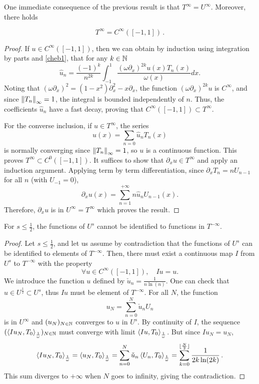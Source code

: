 \documentclass[a4paper]{article}
\begin{document}
\noindent 
One immediate consequence of the previous result is that $T^{\infty} = U^{\infty}$. Moreover, there holds
\begin{Lem}
	\[T^{\infty} = C^{\infty}([-1,1])\,.\]
	\label{LemTinfCinf}
\end{Lem}
\begin{proof}
	If $u \in C^{\infty}([-1,1])$, then we can obtain by induction using integration by parts and \eqref{cheb1}, that for any $k \in \mathbb{N}$
	\[\hat{u}_n = \frac{(-1)^k}{n^{2k}} \int_{-1}^{1} \dfrac{(\omega\partial_x)^{2k} u(x) T_n(x)}{\omega(x)}dx.\]
	Noting that $(\omega \partial_x)^2 = (1-x^2)\partial_x^2 - x \partial_ x$, the function $(\omega \partial_x)^{2k}u$ is $C^{\infty}$, and since $\left\|T_n\right\|_\infty = 1$, the integral is bounded independently of $n$. Thus, the coefficients $\hat{u}_n$ have a fast decay, proving that $C^{\infty}([-1,1]) \subset T^{\infty}$. 
	
	For the converse inclusion, if $u \in T^{\infty}$, the series
	\[ u(x) = \sum_{n=0} \hat{u}_n T_n(x)\]
	is normally converging since $\left\|T_n\right\|_\infty = 1$, so $u$ is a continuous function. This proves $T^{\infty} \subset C^0([-1,1])$. It suffices to show that $\partial_x u \in T^{\infty}$ and apply an induction argument. Applying term by term differentiation, since $\partial_x T_n = n U_{n-1}$ for all $n$ (with $U_{-1} = 0$),
	\[\partial_x u(x) = \sum_{n=1}^{+\infty} n \hat{u}_n U_{n-1}(x).\] 
	Therefore, $\partial_x u$ is in $U^{\infty} = T^{\infty}$ which proves the result.
\end{proof}
\begin{Lem}
	For $s \leq \frac{1}{2}$, the functions of $U^s$ cannot be identified to functions in $T^{-\infty}$. 	
\end{Lem}
\begin{proof}
	Let $s \leq \frac{1}{2}$, and let us assume by contradiction that the functions of $U^{s}$ can be identified to elements of $T^{-\infty}$. Then, there must exist a continuous map $I$ from $U^{s}$ to $T^{-\infty}$ with the property 
	\[\forall u \in C^{\infty}([-1,1]), \quad Iu = u.\]
	We introduce the function $u$ defined by $\check{u}_n = \frac{1}{n \ln(n)}$. One can check that $u \in U^{\frac{1}{2}} \subset U^s$, thus $Iu$ must be element of $T^{-\infty}$. For all $N$, the function 
	\[u_N = \sum_{n = 0}^{N} \check{u}_n U_n\]
	is in $U^{\infty}$ and $(u_N)_{N \in \mathbb{N}}$ converges to $u$ in $U^{s}$. By continuity of $I$, the sequence $(\left\langle I u_N,T_0\right\rangle_\frac{1}{\omega})_{N\in \mathbb{N}}$ must converge with limit $\left\langle Iu,T_0\right\rangle_\frac{1}{\omega}$. But since $Iu_N = u_N$, 
	\[\left\langle Iu_N,T_0\right\rangle_\frac{1}{\omega} = \left\langle u_N,T_0\right\rangle_\frac{1}{\omega} = \sum_{n=0}^{N} \check{u}_n\left\langle U_n,T_0\right\rangle_\frac{1}{\omega} = \sum_{k = 0}^{\lfloor \frac{N}{2} \rfloor} \frac{1}{2k \ln(2k)}\,. \]
	This sum diverges to $+\infty$ when $N$ goes to infinity, giving the contradiction.
\end{proof}
\end{document}

